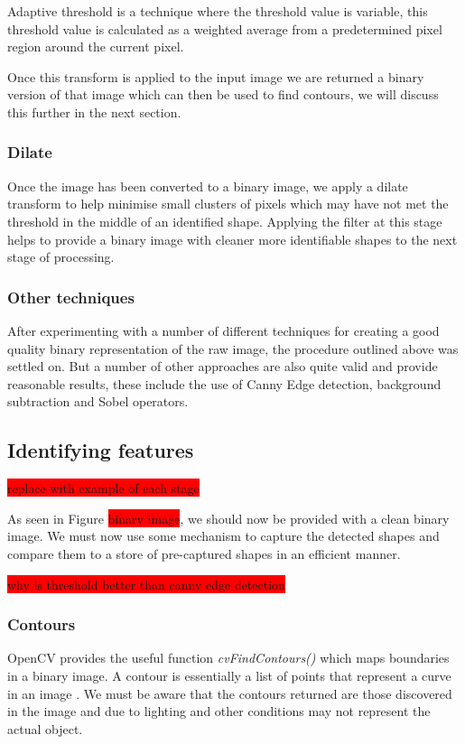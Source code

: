 Adaptive threshold is a technique where the threshold value is variable, this threshold value is calculated as a weighted average from a predetermined pixel region around the current pixel.

Once this transform is applied to the input image we are returned a binary version of that image which can then be used to find contours, we will discuss this further in the next section.


\subsubsection{Dilate}
Once the image has been converted to a binary image, we apply a dilate transform to help minimise small clusters of pixels which may have not met the threshold in the middle of an identified shape. Applying the filter at this stage helps to provide a binary image with cleaner more identifiable shapes to the next stage of processing.


\subsubsection{Other techniques}
After experimenting with a number of different techniques for creating a good quality binary representation of the raw image, the procedure outlined above was settled on. But a number of other approaches are also quite valid and provide reasonable results, these include the use of Canny Edge detection, background subtraction and Sobel operators.


\subsection{Identifying features}

\colorbox{red}{replace with example of each stage}

As seen in Figure \colorbox{red}{binary image}, we should now be provided with a clean binary image. We must now use some mechanism to capture the detected shapes and compare them to a store of pre-captured shapes in an efficient manner. 

\colorbox{red}{why is threshold better than canny edge detection}

\subsubsection{Contours}
OpenCV provides the useful function \emph{cvFindContours()} which maps boundaries in a binary image. A contour is essentially a list of points that represent a curve in an image \cite{bradski08}. We must be aware that the contours returned are those discovered in the image and due to lighting and other conditions may not represent the actual object.

